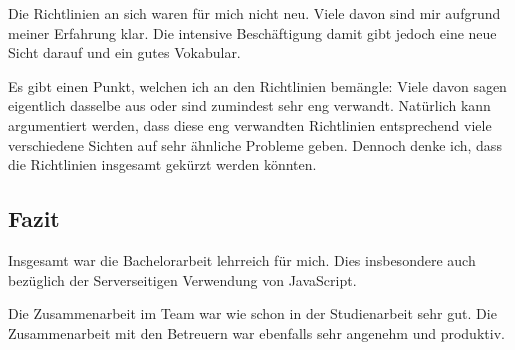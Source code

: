 Die Richtlinien an sich waren für mich nicht neu. Viele davon sind mir aufgrund meiner Erfahrung klar. Die intensive Beschäftigung damit gibt jedoch eine neue Sicht darauf und ein gutes Vokabular.

Es gibt einen Punkt, welchen ich an den Richtlinien bemängle: Viele davon sagen eigentlich dasselbe aus oder sind zumindest sehr eng verwandt. Natürlich kann argumentiert werden, dass diese eng verwandten Richtlinien entsprechend viele verschiedene Sichten auf sehr ähnliche Probleme geben. Dennoch denke ich, dass die Richtlinien insgesamt gekürzt werden könnten.

\subsection*{Fazit}
Insgesamt war die Bachelorarbeit lehrreich für mich. Dies insbesondere auch bezüglich der Serverseitigen Verwendung von JavaScript.

Die Zusammenarbeit im Team war wie schon in der Studienarbeit sehr gut. Die Zusammenarbeit mit den Betreuern war ebenfalls sehr angenehm und produktiv.
